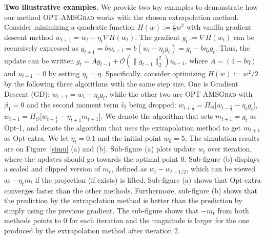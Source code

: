 \documentclass[wcp]{jmlr}
\begin{document}
\textbf{Two illustrative examples.}\hspace{0.1in} 
We provide two toy examples to demonstrate how our method \textsc{OPT-AMSGrad} works with the chosen extrapolation method. 
Consider minimizing a quadratic function $H(w) := \frac{b}{2} w^2 $ with vanilla gradient descent method $w_{t+1} = w_t - \eta_t \nabla H(w_t)$. 
The gradient $g_{t}:= \nabla H(w_{t})$ can be recursively expressed as  $g_{t+1} = b w_{t+1} = b ( w_t  - \eta_t g_t ) = g_t - b \eta_t g_t  $.
Thus, the update can be written $g_t = A g_{t-1}  + \mathcal{O}( \| g_{t-1} \|_2^2 ) u_{t-1}$, where $A = (1 - b \eta)$ and $u_{t-1}=0$ by setting $\eta_t=\eta$.
Specifically, consider optimizing $H(w) := w^2/2 $ by the following three algorithms with the same step size.
One is Gradient Descent (GD): $w_{t+1} = w_t - \eta_t g_t$, while the other two are \textsc{OPT-AMSGrad} with $\beta_1=0$ and the second moment term $\hat{v}_t$ being dropped: $w_{t+\frac{1}{2}} = \Pi_{\Theta}\big[ w_{t-\frac{1}{2}} - \eta_t g_t \big]$, $w_{t+1} = \Pi_{\Theta}\big[ w_{t+\frac{1}{2}} - \eta_{t+1} m_{t+1} \big]$. 
We denote the algorithm that sets $m_{t+1}= g_t$ as Opt-1, and denote the algorithm that uses the extrapolation method to get $m_{t+1}$ as Opt-extra.
We let $\eta_t=0.1$ and the initial point $w_0=5$.
The simulation results are on Figure~\ref{simu} (a) and (b). 
Sub-figure (a) plots update $w_t$ over iteration, where the updates should go towards the optimal point $0$.
Sub-figure (b) displays a scaled and clipped version of $m_t$, defined as $w_t - w_{t-1/2}$, which can be viewed as $- \eta_t m_{t}$ if the projection (if exists) is lifted.
Sub-figure (a) shows that Opt-extra converges faster than the other methods. 
Furthermore, sub-figure (b) shows that the prediction by the extrapolation method is better than the prediction by simply using the previous gradient. 
The sub-figure shows that $-m_t$ from both methods points to $0$ for each iteration and the magnitude is larger for the one produced by the extrapolation method after iteration $2$. 
\end{document}
